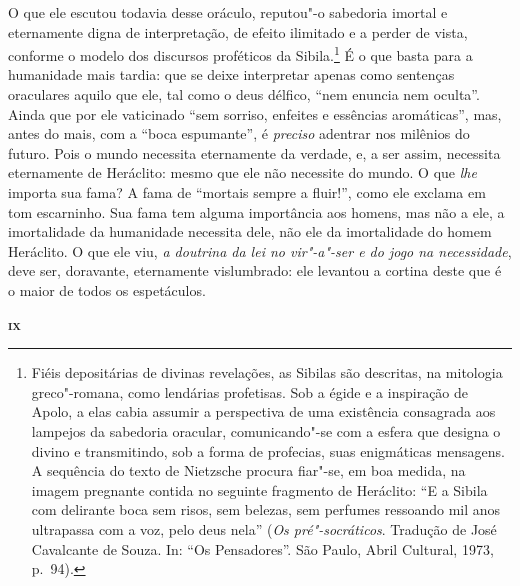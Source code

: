 O que ele escutou todavia desse oráculo, reputou"-o sabedoria imortal e
eternamente digna de interpretação, de efeito ilimitado e a perder de vista,
conforme o modelo dos discursos proféticos da Sibila.\footnote{ Fiéis
depositárias de divinas revelações, as Sibilas são descritas, na mitologia
greco"-romana, como lendárias profetisas. Sob a égide e a inspiração de
Apolo, a elas cabia assumir a perspectiva de uma existência consagrada aos
lampejos da sabedoria oracular, comunicando"-se com a esfera que designa o
divino e transmitindo, sob a forma de profecias, suas enigmáticas mensagens.
A sequência do texto de Nietzsche procura fiar"-se, em boa medida, na imagem
pregnante contida no seguinte fragmento de Heráclito: ``E a Sibila com
delirante boca sem risos, sem belezas, sem perfumes ressoando mil anos
ultrapassa com a voz, pelo deus nela'' (\textit{Os pré"-socráticos}. Tradução
de José Cavalcante de Souza. In: ``Os Pensadores''. São Paulo, Abril
Cultural, 1973, p.~94).} É o que basta para a humanidade mais tardia: que se
deixe interpretar apenas como sentenças oraculares aquilo que ele, tal como o
deus délfico, ``nem enuncia nem oculta''. Ainda que por ele vaticinado ``sem
sorriso, enfeites e essências aromáticas'', mas, antes do mais, com a ``boca
espumante'', é \textit{preciso} adentrar nos milênios do futuro. Pois o mundo
necessita eternamente da verdade, e, a ser assim, necessita eternamente de
Heráclito: mesmo que ele não necessite do mundo. O que \textit{lhe} importa
sua fama? A fama de ``mortais sempre a fluir!'', como ele exclama em tom
escarninho. Sua fama tem alguma importância aos homens, mas não a ele, a
imortalidade da humanidade necessita dele, não ele da imortalidade do homem
Heráclito. O que ele viu, \textit{a doutrina da lei no vir"-a"-ser e do jogo
na necessidade}, deve ser, doravante, eternamente vislumbrado: ele levantou a
cortina deste que é o maior de todos os espetáculos.

\bigskip
\textsc{\textbf{ix}}
\bigskip

